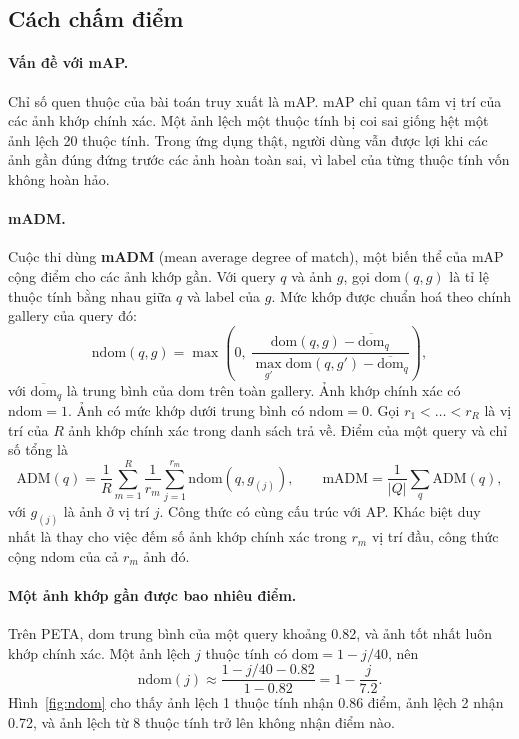 \documentclass[11pt,a4paper]{article}
\newcommand{\ndom}{\mathrm{ndom}}
\begin{document}
\subsection{Cách chấm điểm}
\label{sec:metric}

\paragraph{Vấn đề với mAP.} Chỉ số quen thuộc của bài toán truy xuất là mAP. mAP chỉ quan tâm vị trí của các ảnh khớp chính xác. Một ảnh lệch một thuộc tính bị coi sai giống hệt một ảnh lệch 20 thuộc tính. Trong ứng dụng thật, người dùng vẫn được lợi khi các ảnh gần đúng đứng trước các ảnh hoàn toàn sai, vì label của từng thuộc tính vốn không hoàn hảo.

\paragraph{mADM.} Cuộc thi dùng \textbf{mADM} (mean average degree of match), một biến thể của mAP cộng điểm cho các ảnh khớp gần. Với query $q$ và ảnh $g$, gọi $\mathrm{dom}(q,g)$ là tỉ lệ thuộc tính bằng nhau giữa $q$ và label của $g$. Mức khớp được chuẩn hoá theo chính gallery của query đó:
\begin{equation}
\ndom(q,g)=\max\!\left(0,\ \frac{\mathrm{dom}(q,g)-\overline{\mathrm{dom}}_q}{\max_{g'}\mathrm{dom}(q,g')-\overline{\mathrm{dom}}_q}\right),
\end{equation}
với $\overline{\mathrm{dom}}_q$ là trung bình của dom trên toàn gallery. Ảnh khớp chính xác có $\ndom=1$. Ảnh có mức khớp dưới trung bình có $\ndom=0$. Gọi $r_1<\dots<r_R$ là vị trí của $R$ ảnh khớp chính xác trong danh sách trả về. Điểm của một query và chỉ số tổng là
\begin{equation}
\mathrm{ADM}(q)=\frac{1}{R}\sum_{m=1}^{R}\frac{1}{r_m}\sum_{j=1}^{r_m}\ndom(q,g_{(j)}), \qquad \mathrm{mADM}=\frac{1}{|Q|}\sum_{q}\mathrm{ADM}(q),
\end{equation}
với $g_{(j)}$ là ảnh ở vị trí $j$. Công thức có cùng cấu trúc với AP. Khác biệt duy nhất là thay cho việc đếm số ảnh khớp chính xác trong $r_m$ vị trí đầu, công thức cộng ndom của cả $r_m$ ảnh đó.

\paragraph{Một ảnh khớp gần được bao nhiêu điểm.} Trên PETA, dom trung bình của một query khoảng 0.82, và ảnh tốt nhất luôn khớp chính xác. Một ảnh lệch $j$ thuộc tính có $\mathrm{dom}=1-j/40$, nên
\begin{equation}
\ndom(j)\approx\frac{1-j/40-0.82}{1-0.82}=1-\frac{j}{7.2}.
\end{equation}
Hình~\ref{fig:ndom} cho thấy ảnh lệch 1 thuộc tính nhận 0.86 điểm, ảnh lệch 2 nhận 0.72, và ảnh lệch từ 8 thuộc tính trở lên không nhận điểm nào.
\end{document}
